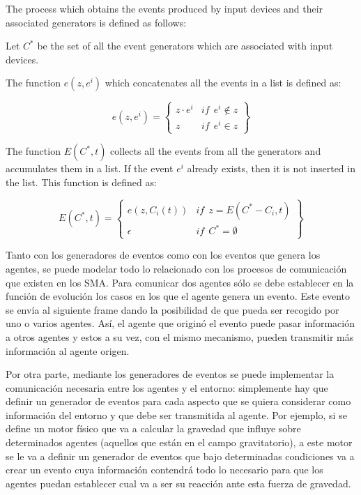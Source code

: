\documentclass[runningheads]{llncs}
\begin{document}
The process which obtains the events produced by input devices and their associated 
generators is defined as follows:



{\itshape

Let $C^*$ be the set of all the event generators which are associated with input
devices.

}


The function $e(z, e^i)$ which concatenates all the events in a list is defined
as:

\begin{equation}
    e(z, e^i) = \left\{
    \begin{array}{ll}
        z \cdot e^i   &   \mathit{if} \ \ e^i \notin z \\
        z    &   \mathit{if} \ \ e^i \in z
    \end{array}
    \right\}
\end{equation}


The function $E(C^*, t)$ collects all the events from all the generators and accumulates them in a
list. If the event $e^i$ already exists, then it is not inserted in the list. This function is
defined as:


\begin{equation}
    E(C^*, t) = \left\{
    \begin{array}{ll}
        e(z, C_i(t))   &  \mathit{if}  \ \ z = E(C^* - C_i, t) \\
        \epsilon   &  \mathit{if} \ \ C^* = \emptyset
    \end{array}
    \right\}
\end{equation}


Tanto con los generadores de eventos como con los eventos que genera los agentes, se puede modelar todo lo relacionado con los procesos de comunicación que existen en los SMA. Para comunicar dos agentes sólo se debe establecer en la función de evolución los casos en los que el agente genera un evento. Este evento se envía al siguiente frame dando la posibilidad de que pueda ser recogido por uno o varios agentes. Así, el agente que originó el evento puede pasar información a otros agentes y estos a su vez, con el mismo mecanismo, pueden transmitir más información al agente origen.

Por otra parte, mediante los generadores de eventos se puede implementar la comunicación necesaria entre los agentes y el entorno: simplemente hay que definir un generador de eventos para cada aspecto que se quiera considerar como información del entorno y que debe ser transmitida al agente. Por ejemplo, si se define un motor físico que va a calcular la gravedad que influye sobre determinados agentes (aquellos que están en el campo gravitatorio), a este motor se le va a definir un generador de eventos que bajo determinadas condiciones va a crear un evento cuya información contendrá todo lo necesario para que los agentes puedan establecer cual va a ser su reacción ante esta fuerza de gravedad.
\end{document}
